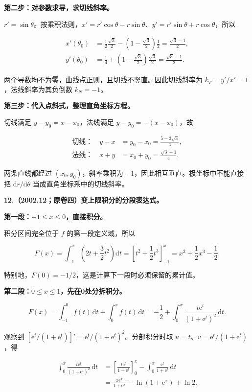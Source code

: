 \documentclass[UTF8,11pt,fontset=windows]{ctexart}
\begin{document}
\textbf{第二步：对参数求导，求切线斜率。}

$r'=\sin\theta$。按乘积法则，$x'=r'\cos\theta-r\sin\theta$、$y'=r'\sin\theta+r\cos\theta$，所以

$$
\begin{aligned}
x'(\theta_0)&=\frac12\frac{\sqrt3}{2}-\left(1-\frac{\sqrt3}{2}\right)\frac12
=\frac{\sqrt3-1}{2},\\
y'(\theta_0)&=\frac14+\left(1-\frac{\sqrt3}{2}\right)\frac{\sqrt3}{2}
=\frac{\sqrt3-1}{2}.
\end{aligned}
$$

两个导数均不为零，曲线点正则，且切线不竖直。因此切线斜率为 $k_T=y'/x'=1$，法线斜率为其负倒数 $k_N=-1$。

\textbf{第三步：代入点斜式，整理直角坐标方程。}

切线满足 $y-y_0=x-x_0$，法线满足 $y-y_0=-(x-x_0)$，故

$$
\begin{aligned}
\text{切线：}\quad y-x&=y_0-x_0=\boxed{\frac{5-3\sqrt3}{4}},\\
\text{法线：}\quad x+y&=x_0+y_0=\boxed{\frac{\sqrt3-1}{4}}.
\end{aligned}
$$

两条直线都经过 $(x_0,y_0)$，斜率乘积为 $-1$，因此相互垂直。极坐标中不能直接把 $\mathrm dr/\mathrm d\theta$ 当成直角坐标系中的切线斜率。

\clearpage

\textbf{12.（2002.12；原卷四）变上限积分的分段表达式。}

\textbf{第一段：$-1\le x\le0$，直接积分。}

积分区间完全位于 $f$ 的第一段定义域，所以

$$
F(x)=\int_{-1}^x\left(2t+\frac32t^2\right)\mathrm dt
=\left[t^2+\frac12t^3\right]_{-1}^x
=x^2+\frac12x^3-\frac12.
$$

特别地，$F(0)=-1/2$，这是计算下一段时必须保留的累计值。

\textbf{第二段：$0\le x\le1$，先在0处分拆积分。}

$$
F(x)=\int_{-1}^{0}f(t)\,\mathrm dt+\int_0^x f(t)\,\mathrm dt
=-\frac12+\int_0^x\frac{t\mathrm e^t}{(1+\mathrm e^t)^2}\,\mathrm dt.
$$

观察到 $[\mathrm e^t/(1+\mathrm e^t)]'=\mathrm e^t/(1+\mathrm e^t)^2$。分部积分时取 $u=t$、$v=\mathrm e^t/(1+\mathrm e^t)$，得

$$
\begin{aligned}
\int_0^x\frac{t\mathrm e^t}{(1+\mathrm e^t)^2}\,\mathrm dt
&=\left[\frac{t\mathrm e^t}{1+\mathrm e^t}\right]_0^x
-\int_0^x\frac{\mathrm e^t}{1+\mathrm e^t}\,\mathrm dt\\
&=\frac{x\mathrm e^x}{1+\mathrm e^x}-\ln(1+\mathrm e^x)+\ln2.
\end{aligned}
$$
\end{document}

